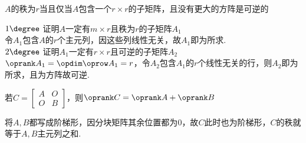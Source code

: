 \begin{theorem}[秩的进阶定理]
\begin{partlist}
	\item $A$的秩为$r$当且仅当$A$包含一个$r\times r$的子矩阵，且没有更大的方阵是可逆的
	\begin{analysis}
	$1\degree$ 证明$A$一定有$m\times r$且秩为$r$的子矩阵$A_1$\\
	令$A_1$包含$A$的$r$个主元列，因这些列线性无关，故$A_1$即为所求.\\
	$2\degree$ 证明$A_1$一定有$r\times r$且可逆的子矩阵$A_2$\\
	$\oprank A_1=\opdim\oprow A_1=r$，令$A_2$包含$A_1$的$r$个线性无关的行，则$A_2$即为所求，且为方阵故可逆.
	\end{analysis}
	\item 若$C=\begin{bmatrix}A&O\\O&B\end{bmatrix}$，则$\oprank C=\oprank A+\oprank B$
	\begin{analysis}
	将$A,B$都写成阶梯形，因分块矩阵其余位置都为$0$，故$C$此时也为阶梯形，$C$的秩就等于$A,B$主元列之和.
	\end{analysis}
\end{partlist}
\end{theorem}

